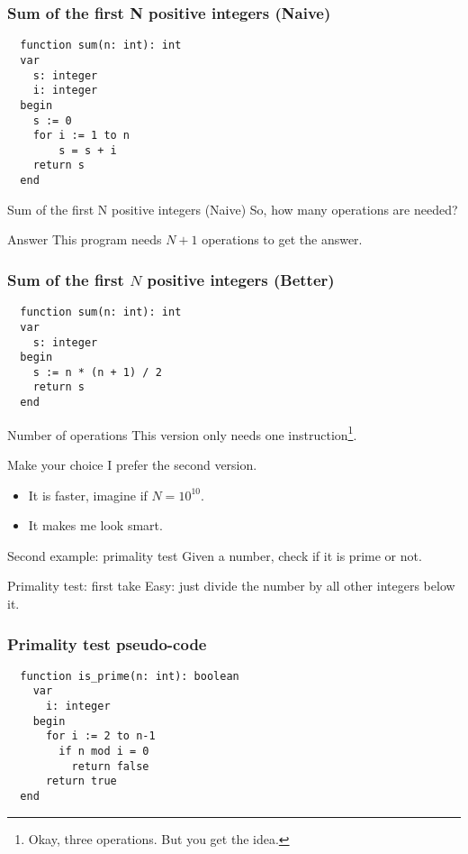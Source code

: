 \documentclass{beamer}
\begin{document}
\begin{frame}[fragile]
\justifying
\frametitle{Sum of the first N positive integers (Naive)}
\begin{verbatim}
  function sum(n: int): int
  var
    s: integer
    i: integer
  begin
    s := 0
    for i := 1 to n
        s = s + i
    return s
  end
\end{verbatim}
\end{frame}

\begin{frame}{Sum of the first N positive integers (Naive)}
\justifying
So, how many operations are needed?
\end{frame}

\begin{frame}{Answer}
\justifying
This program needs $N + 1$ operations to get the answer.
\end{frame}

\begin{frame}[fragile]
\frametitle{Sum of the first $N$ positive integers (Better)}
\begin{verbatim}
  function sum(n: int): int
  var
    s: integer
  begin
    s := n * (n + 1) / 2
    return s
  end
\end{verbatim}
\end{frame}

\begin{frame}{Number of operations}
\justifying
This version only needs one instruction\footnote{Okay, three operations. But you get the idea.}.
\end{frame}

\begin{frame}{Make your choice}
I prefer the second version.
\begin{itemize}
  \item It is faster, imagine if $N = 10^{10}$.
  \item It makes me look smart.
\end{itemize}
\end{frame}

\begin{frame}{Second example: primality test}
\justifying
Given a number, check if it is prime or not.
\end{frame}

\begin{frame}{Primality test: first take}
Easy: just divide the number by all other integers below it.
\end{frame}

\begin{frame}[fragile]
\frametitle{Primality test pseudo-code}
\begin{verbatim}
  function is_prime(n: int): boolean
    var
      i: integer
    begin
      for i := 2 to n-1
        if n mod i = 0
          return false
      return true
  end
\end{verbatim}
\end{frame}
\end{document}
